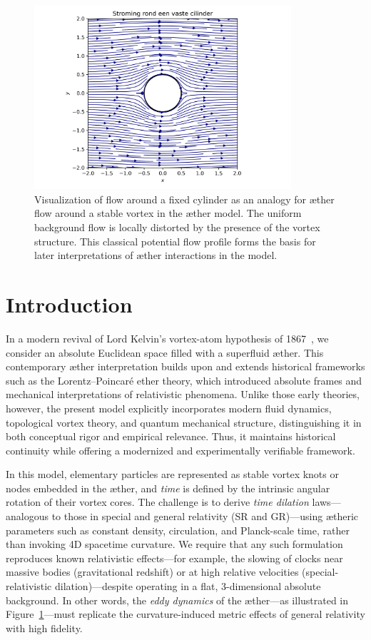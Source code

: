 \begin{figure}[htbp]
    \centering
    \includegraphics[width=0.85\textwidth]{../02_cylinder_flow}
    \caption{Visualization of flow around a fixed cylinder as an analogy for æther flow around a stable vortex in the æther model. The uniform background flow is locally distorted by the presence of the vortex structure. This classical potential flow profile forms the basis for later interpretations of æther interactions in the model.}
    \label{fig:cylinderflow}
\end{figure}

\section{Introduction}
In a modern revival of Lord Kelvin's vortex-atom hypothesis of 1867~\cite{Kelvin1867-vortex}, we consider an absolute Euclidean space filled with a superfluid æther. This contemporary æther interpretation builds upon and extends historical frameworks such as the Lorentz–Poincaré ether theory, which introduced absolute frames and mechanical interpretations of relativistic phenomena. Unlike those early theories, however, the present model explicitly incorporates modern fluid dynamics, topological vortex theory, and quantum mechanical structure, distinguishing it in both conceptual rigor and empirical relevance. Thus, it maintains historical continuity while offering a modernized and experimentally verifiable framework.

In this model, elementary particles are represented as stable vortex knots or nodes embedded in the æther, and \emph{time} is defined by the intrinsic angular rotation of their vortex cores. The challenge is to derive \emph{time dilation} laws—analogous to those in special and general relativity (SR and GR)—using ætheric parameters such as constant density, circulation, and Planck-scale time, rather than invoking 4D spacetime curvature. We require that any such formulation reproduces known relativistic effects—for example, the slowing of clocks near massive bodies (gravitational redshift) or at high relative velocities (special-relativistic dilation)—despite operating in a flat, 3-dimensional absolute background. In other words, the \emph{eddy dynamics} of the æther—as illustrated in Figure~\ref{fig:cylinderflow}—must replicate the curvature-induced metric effects of general relativity with high fidelity.

